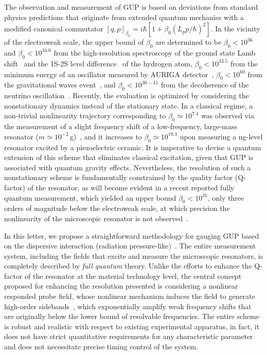 \documentclass[aps,prl,twocolumn,superscriptaddress]{revtex4-2}
\begin{document}
The observation and measurement of GUP is based on deviations from standard physics predictions that originate from extended quantum mechanics with a modified canonical commutator $[q,p]_{\beta_0}=i\hbar[1+\beta_0({L_p p}/{\hbar})^2]$. In the vicinity of the electroweak scale, the upper bound of $\beta_0$ are determined to be $\beta_0<10^{36}$ and $\beta_0<10^{34.6}$ from the high-resolution spectroscopy of the ground state Lamb shift~\cite{Das2008,Ali2011} and the 1S-2S level difference~\cite{Quesne2010} of the hydrogen atom, $\beta_0<10^{33.5}$ from the minimum energy of an oscillator measured by AURIGA detector~\cite{Marin2013}, $\beta_0<10^{60}$ from the gravitational waves event~\cite{Das2021}, and $\beta_0<10^{30-41}$ from the decoherence of the neutrino oscillation~\cite{Abi2020}. Recently, the evaluation is optimized by considering the nonstationary dynamics instead of the stationary state. In a classical regime, a non-trivial nonlinearity trajectory corresponding to $\beta_0\simeq 10^{7.4}$ was observed via the measurement of a slight frequency shift of a low-frequency, large-mass resonator ($m\simeq 10^{-2}$\,g)~\cite{Bawaj2015}, and it increases to $\beta_0\simeq 10^{19.3}$ upon measuring a ng-level resonator excited by a piezoelectric ceramic. It is imperative to devise a quantum extension of this scheme that eliminates classical excitation, given that GUP is associated with quantum gravity effects. Nevertheless, the resolution of such a nonstationary scheme is fundamentally constrained by the quality factor ($\text{Q}$-factor) of the resonator, as will become evident in a recent reported fully quantum measurement, which yielded an upper bound $\beta_0<10^{31}$, only three orders of magnitude below the electroweak scale, at which precision the nonlinearity of the microscopic resonator is not observed~\cite{Bonaldi2020}. 

In this letter, we propose a straightforward methodology for gauging GUP based on the dispersive interaction (radiation pressure-like)~\cite{Aspelmeyer2014}.  The entire measurement system, including  the fields that excite and measure the microscopic resonators, is  completely described by \textit{full quantum} theory. Unlike the efforts to enhance the $\text{Q}$-factor of the resonator at the material technology level, the central concept proposed for enhancing the resolution presented is considering a nonlinear responded probe field, whose nonlinear mechanism induces the field to generate high-order sidebands~\cite{Marquardt2006}, which exponentially amplify weak frequency shifts that are originally below the lower bound of resolvable frequencies. The entire scheme is robust and realistic with respect to existing experimental apparatus, in fact, it does not have strict quantitative requirements for any characteristic parameter and does not necessitate precise timing control of the system. 
\end{document}
